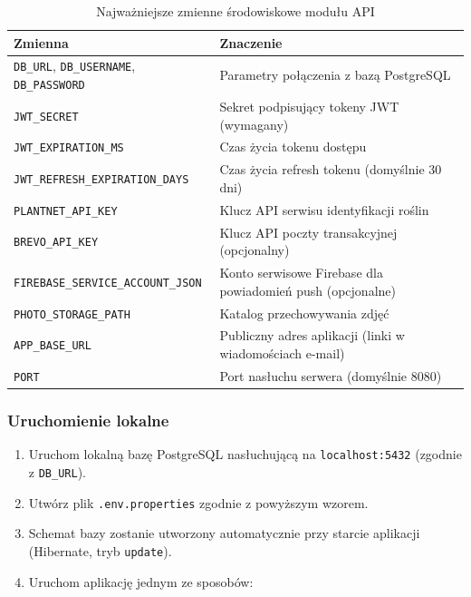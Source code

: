 \documentclass[12pt,a4paper]{article}
\begin{document}
\begin{table}[htbp]
\centering
\caption{Najwa\.zniejsze zmienne \'srodowiskowe modu\l{}u API}
\label{tab:env}
\vspace{0.3em}
\begin{tabularx}{\textwidth}{@{}lX@{}}
\toprule
\textbf{Zmienna} & \textbf{Znaczenie} \\
\midrule
\texttt{DB\_URL}, \texttt{DB\_USERNAME}, \texttt{DB\_PASSWORD} & Parametry po\l{}\k{a}czenia z baz\k{a} PostgreSQL \\ \addlinespace
\texttt{JWT\_SECRET} & Sekret podpisuj\k{a}cy tokeny JWT (wymagany) \\ \addlinespace
\texttt{JWT\_EXPIRATION\_MS} & Czas \.zycia tokenu dost\k{e}pu \\ \addlinespace
\texttt{JWT\_REFRESH\_EXPIRATION\_DAYS} & Czas \.zycia refresh tokenu (domy\'slnie 30 dni) \\ \addlinespace
\texttt{PLANTNET\_API\_KEY} & Klucz API serwisu identyfikacji ro\'slin \\ \addlinespace
\texttt{BREVO\_API\_KEY} & Klucz API poczty transakcyjnej (opcjonalny) \\ \addlinespace
\texttt{FIREBASE\_\allowbreak{}SERVICE\_\allowbreak{}ACCOUNT\_\allowbreak{}JSON} & Konto serwisowe Firebase dla powiadomie\'n push (opcjonalne) \\ \addlinespace
\texttt{PHOTO\_STORAGE\_PATH} & Katalog przechowywania zdj\k{e}\'c \\ \addlinespace
\texttt{APP\_BASE\_URL} & Publiczny adres aplikacji (linki w wiadomo\'sciach e-mail) \\ \addlinespace
\texttt{PORT} & Port nas\l{}uchu serwera (domy\'slnie 8080) \\
\bottomrule
\end{tabularx}
\end{table}

\subsubsection{Uruchomienie lokalne}

\begin{enumerate}[leftmargin=1.6cm]
    \item Uruchom lokaln\k{a} baz\k{e} PostgreSQL nas\l{}uchuj\k{a}c\k{a} na \texttt{localhost:5432} (zgodnie z \texttt{DB\_URL}).
    \item Utw\'orz plik \texttt{.env.properties} zgodnie z powy\.zszym wzorem.
    \item Schemat bazy zostanie utworzony automatycznie przy starcie aplikacji (Hibernate, tryb \texttt{update}).
    \item Uruchom aplikacj\k{e} jednym ze sposob\'ow:
\end{enumerate}
\end{document}
